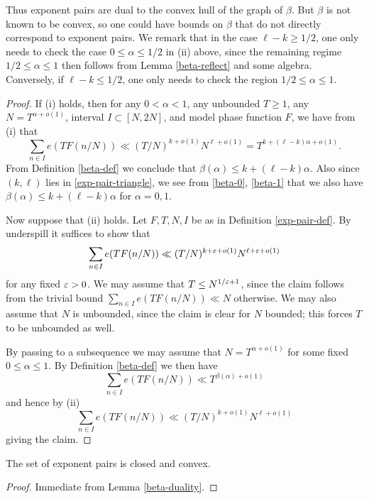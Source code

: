 
Thus exponent pairs are dual to the convex hull of the graph of $\beta$.  But $\beta$ is not known to be convex, so one could have bounds on $\beta$ that do not directly correspond to exponent pairs.  We remark that in the case $\ell - k \geq 1/2$, one only needs to check the case $0 \leq \alpha \leq 1/2$ in (ii) above, since the remaining regime $1/2 \leq \alpha \leq 1$ then follows from Lemma \ref{beta-reflect} and some algebra.  Conversely, if $\ell - k \leq 1/2$, one only needs to check the region $1/2 \leq \alpha \leq 1$.

\begin{proof}  If (i) holds, then for any $0 < \alpha < 1$, any unbounded $T \geq 1$, any $N = T^{\alpha+o(1)}$, interval $I \subset [N,2N]$, and model phase function $F$, we have from (i) that
$$ \sum_{n \in I} e(T F(n/N)) \ll (T/N)^{k+o(1)} N^{\ell+o(1)} = T^{k + (\ell-k)\alpha + o(1)}.$$
From Definition \ref{beta-def} we conclude that $\beta(\alpha) \leq k + (\ell-k) \alpha$.  Also since $(k,\ell)$ lies in \eqref{exp-pair-triangle}, we see from \eqref{beta-0}, \eqref{beta-1} that we also have $\beta(\alpha) \leq k + (\ell-k) \alpha$ for $\alpha=0,1$.

Now suppose that (ii) holds.  Let $F, T, N, I$ be as in Definition \ref{exp-pair-def}.  By underspill it suffices to show that
$$ \sum_{n \in I} e(T F(n/N)) \ll (T/N)^{k+\varepsilon+o(1)} N^{\ell+\varepsilon+o(1)}$$
for any fixed $\varepsilon>0$.  We may assume that $T \leq N^{1/\varepsilon+1}$, since the claim follows from the trivial bound $\sum_{n \in I} e(T F(n/N)) \ll N$ otherwise.  We may also assume that $N$ is unbounded, since the claim is clear for $N$ bounded; this forces $T$ to be unbounded as well.

By passing to a subsequence we may assume that $N = T^{\alpha+o(1)}$ for some fixed $0 \leq \alpha \leq 1$.  By Definition \ref{beta-def} we then have
$$ \sum_{n \in I} e(T F(n/N)) \ll T^{\beta(\alpha)+o(1)}$$
and hence by (ii)
$$ \sum_{n \in I} e(T F(n/N)) \ll (T/N)^{k+o(1)} N^{\ell+o(1)}$$
giving the claim.
\end{proof}


\begin{corollary}\label{exp-pair-closed} The set of exponent pairs is closed and convex.
\end{corollary}

\begin{proof} Immediate from Lemma \ref{beta-duality}.
\end{proof}

